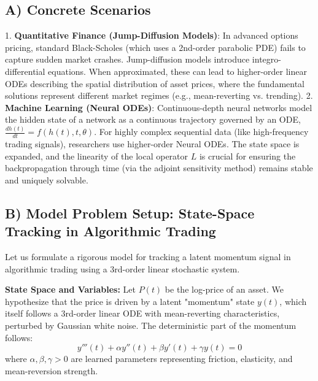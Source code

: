 \documentclass[11pt,letterpaper]{article}
\begin{document}
\subsection{A) Concrete Scenarios}
1. \textbf{Quantitative Finance (Jump-Diffusion Models)}: In advanced options pricing, standard Black-Scholes (which uses a 2nd-order parabolic PDE) fails to capture sudden market crashes. Jump-diffusion models introduce integro-differential equations. When approximated, these can lead to higher-order linear ODEs describing the spatial distribution of asset prices, where the fundamental solutions represent different market regimes (e.g., mean-reverting vs. trending).
2. \textbf{Machine Learning (Neural ODEs)}: Continuous-depth neural networks model the hidden state of a network as a continuous trajectory governed by an ODE, $\frac{dh(t)}{dt} = f(h(t), t, \theta)$. For highly complex sequential data (like high-frequency trading signals), researchers use higher-order Neural ODEs. The state space is expanded, and the linearity of the local operator $L$ is crucial for ensuring the backpropagation through time (via the adjoint sensitivity method) remains stable and uniquely solvable.

\subsection{B) Model Problem Setup: State-Space Tracking in Algorithmic Trading}
Let us formulate a rigorous model for tracking a latent momentum signal in algorithmic trading using a 3rd-order linear stochastic system.

\textbf{State Space and Variables:}
Let $P(t)$ be the log-price of an asset. We hypothesize that the price is driven by a latent "momentum" state $y(t)$, which itself follows a 3rd-order linear ODE with mean-reverting characteristics, perturbed by Gaussian white noise.
The deterministic part of the momentum follows:
\[ y'''(t) + \alpha y''(t) + \beta y'(t) + \gamma y(t) = 0 \]
where $\alpha, \beta, \gamma > 0$ are learned parameters representing friction, elasticity, and mean-reversion strength.
\end{document}
